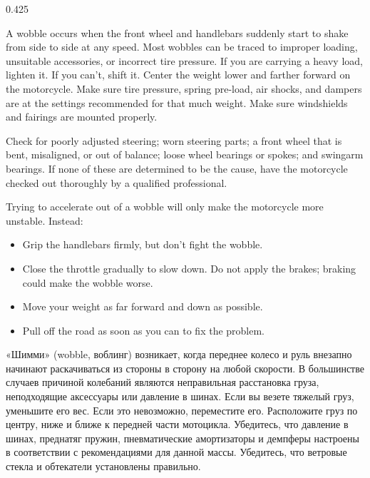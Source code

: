 \begin{langblock}{0.425}
	\begin{eng}
	
	A wobble occurs when the front wheel and handlebars suddenly start to shake from side to side at any speed. Most wobbles can be traced to improper loading, unsuitable accessories, or incorrect tire pressure.  If you are carrying a heavy load, lighten it. If you can't, shift it. Center the weight lower and farther forward on the motorcycle. Make sure tire pressure, spring pre-load, air shocks, and dampers are at the settings recommended for that much weight.  Make sure windshields and fairings are mounted properly.
	
	Check for poorly adjusted steering; worn steering parts; a front wheel that is bent, misaligned, or out of balance; loose wheel bearings or spokes; and swingarm bearings.  If none of these are determined to be the cause, have the motorcycle checked out thoroughly by a qualified professional.
	
	Trying to accelerate out of a wobble will only make the motorcycle more unstable. Instead:
	
	\begin{itemize}[noitemsep]
		\item Grip the handlebars firmly, but don't fight the wobble.
		\item Close the throttle gradually to slow down. Do not apply the brakes; braking could make the wobble worse.
		\item Move your weight as far forward and down as possible.
		\item Pull off the road as soon as you can to fix the problem.
	\end{itemize}
	\end{eng}
	\begin{rus}
		
		«Шимми» (wobble, воблинг) возникает, когда переднее колесо и руль внезапно начинают раскачиваться из стороны в сторону на любой скорости. В большинстве случаев причиной колебаний являются неправильная расстановка груза, неподходящие аксессуары или давление в шинах.  Если вы везете тяжелый груз, уменьшите его вес. Если это невозможно, переместите его. Расположите груз по центру, ниже и ближе к передней части мотоцикла. Убедитесь, что давление в шинах, преднатяг пружин, пневматические амортизаторы и демпферы настроены в соответствии с рекомендациями для данной массы.  Убедитесь, что ветровые стекла и обтекатели установлены правильно.
		

\end{rus}
\end{langblock}
